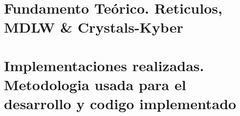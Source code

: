 \documentclass[print, color]{ugrTFG}
\begin{document}
\maketitle

\frontmatter %

   
            

                    
               

\mainmatter %


\part{Fundamento Teórico. Reticulos, MDLW \& Crystals-Kyber} %








\part{Implementaciones realizadas. Metodologia usada para el desarrollo y codigo implementado}





\appendix %
\end{document}
